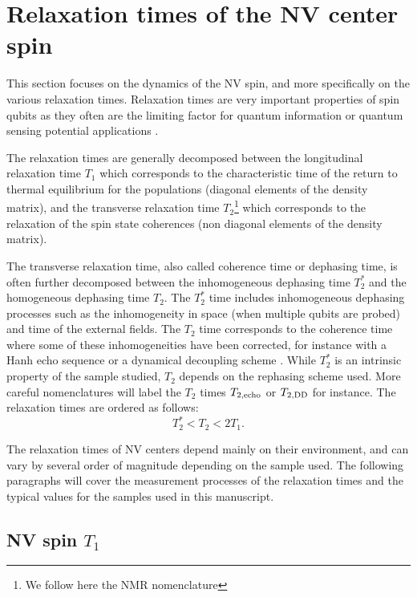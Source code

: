 \documentclass[a4paper,11pt]{report}
\begin{document}
\section{Relaxation times of the NV center spin}

This section focuses on the dynamics of the NV spin, and more specifically on the various relaxation times. Relaxation times are very important properties of spin qubits as they often are the limiting factor for quantum information or quantum sensing potential applications \citep{de2021materials, degen2017quantum}.

The relaxation times are generally decomposed between the longitudinal relaxation time $T_1$ which corresponds to the characteristic time of the return to thermal equilibrium for the populations (diagonal elements of the density matrix), and the transverse relaxation time $T_2$\footnote{We follow here the NMR nomenclature} which corresponds to the relaxation of the spin state coherences (non diagonal elements of the density matrix).

The transverse relaxation time, also called coherence time or dephasing time, is often further decomposed between the inhomogeneous dephasing time $T_2^*$ and the homogeneous dephasing time $T_2$. The $T_2^*$ time includes inhomogeneous dephasing processes such as the inhomogeneity in space (when multiple qubits are probed) and time of the external fields. The $T_2$ time corresponds to the coherence time where some of these inhomogeneities have been corrected, for instance with a Hanh echo sequence \citep{hahn1950spin} or a dynamical decoupling scheme \citep{naydenov2011dynamical}. While $T_2^*$ is an intrinsic property of the sample studied, $T_2$ depends on the rephasing scheme used. More careful nomenclatures will label the $T_2$ times $T_{2,\rm echo}$ or $T_{2,\rm DD}$ \citep{de2021materials} for instance. The relaxation times are ordered as follows:
\begin{equation}
T_2^* < T_2 < 2 T_1.
\end{equation}

The relaxation times of NV centers depend mainly on their environment, and can vary by several order of magnitude depending on the sample used. The following paragraphs will cover the measurement processes of the relaxation times and the typical values for the samples used in this manuscript.

\subsection{NV spin $T_1$}
\end{document}
